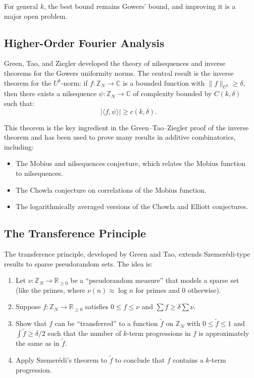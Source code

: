 For general $k$, the best bound remains Gowers' bound, and improving it is a major open problem.

\subsection{Higher-Order Fourier Analysis}

Green, Tao, and Ziegler developed the theory of nilsequences and inverse theorems for the Gowers uniformity norms. The central result is the inverse theorem for the $U^k$-norm: if $f: \mathbb{Z}_N \to \mathbb{C}$ is a bounded function with $\|f\|_{U^k} \geq \delta$, then there exists a nilsequence $\psi: \mathbb{Z}_N \to \mathbb{C}$ of complexity bounded by $C(k,\delta)$ such that:
\[
|\langle f, \psi \rangle| \geq c(k,\delta).
\]

This theorem is the key ingredient in the Green--Tao--Ziegler proof of the inverse theorem and has been used to prove many results in additive combinatorics, including:
\begin{itemize}
\item The Mobius and nilsequences conjecture, which relates the Mobius function to nilsequences.
\item The Chowla conjecture on correlations of the Mobius function.
\item The logarithmically averaged versions of the Chowla and Elliott conjectures.
\end{itemize}

\subsection{The Transference Principle}

The transference principle, developed by Green and Tao, extends Szemer\'edi-type results to sparse pseudorandom sets. The idea is:
\begin{enumerate}
\item Let $\nu: \mathbb{Z}_N \to \mathbb{R}_{\geq 0}$ be a ``pseudorandom measure'' that models a sparse set (like the primes, where $\nu(n) \approx \log n$ for primes and 0 otherwise).
\item Suppose $f: \mathbb{Z}_N \to \mathbb{R}_{\geq 0}$ satisfies $0 \leq f \leq \nu$ and $\sum f \geq \delta \sum \nu$.
\item Show that $f$ can be ``transferred'' to a function $\tilde{f}$ on $\mathbb{Z}_N$ with $0 \leq \tilde{f} \leq 1$ and $\int \tilde{f} \geq \delta/2$ such that the number of $k$-term progressions in $f$ is approximately the same as in $\tilde{f}$.
\item Apply Szemer\'edi's theorem to $\tilde{f}$ to conclude that $f$ contains a $k$-term progression.
\end{enumerate}

